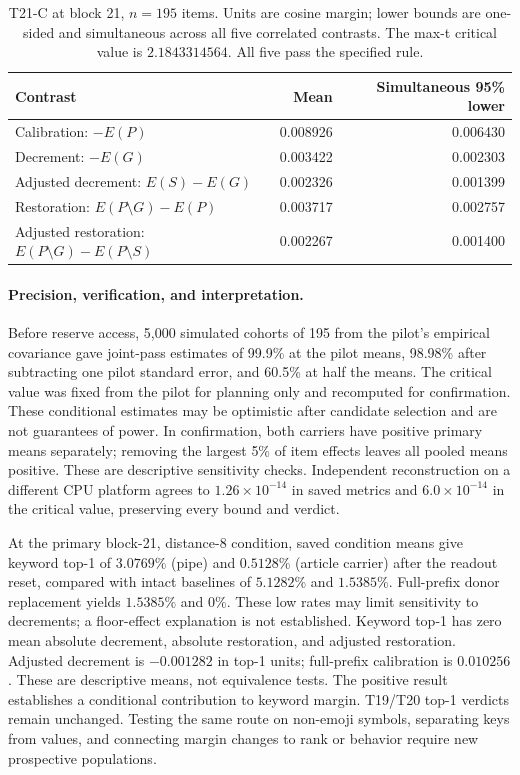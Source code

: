 \documentclass{article}
\begin{document}
\begin{table}[ht]
\centering
\small
\begin{tabular}{lrr}
\toprule
Contrast & Mean & Simultaneous 95\% lower \\
\midrule
Calibration: $-E(P)$ & 0.008926 & 0.006430 \\
Decrement: $-E(G)$ & 0.003422 & 0.002303 \\
Adjusted decrement: $E(S)-E(G)$ & 0.002326 & 0.001399 \\
Restoration: $E(P\setminus G)-E(P)$ & 0.003717 & 0.002757 \\
Adjusted restoration: $E(P\setminus G)-E(P\setminus S)$ & 0.002267 & 0.001400 \\
\bottomrule
\end{tabular}
\caption{T21-C at block 21, $n=195$ items. Units are cosine margin; lower
bounds are one-sided and simultaneous across all five correlated contrasts.
The max-t critical value is $2.1843314564$. All five pass the specified rule.}
\label{tab:t21}
\end{table}

\paragraph{Precision, verification, and interpretation.}
Before reserve access, 5,000 simulated cohorts of 195 from the pilot's
empirical covariance gave joint-pass estimates of 99.9\% at the pilot means,
98.98\% after subtracting one pilot standard error, and 60.5\% at half the
means. The critical value was fixed from the pilot for planning only and
recomputed for confirmation. These conditional estimates may be optimistic
after candidate selection and are not guarantees of power.
In confirmation, both carriers have positive primary means separately;
removing the largest 5\% of item effects leaves all pooled means positive.
These are descriptive sensitivity checks. Independent reconstruction on a
different CPU platform agrees to $1.26\times10^{-14}$ in saved metrics and
$6.0\times10^{-14}$ in the critical value, preserving every bound and verdict.

At the primary block-21, distance-8 condition, saved condition means give
keyword top-1 of $3.0769\%$ (pipe) and $0.5128\%$ (article carrier) after
the readout reset, compared with intact baselines of $5.1282\%$ and
$1.5385\%$. Full-prefix donor replacement yields $1.5385\%$ and $0\%$.
These low rates may limit sensitivity to decrements; a floor-effect
explanation is not established.
Keyword top-1 has zero mean absolute decrement, absolute restoration, and
adjusted restoration. Adjusted decrement is $-0.001282$ in top-1 units;
full-prefix calibration is $0.010256$. These are descriptive means, not
equivalence tests. The positive result establishes a conditional contribution
to keyword margin. T19/T20 top-1 verdicts remain unchanged. Testing the
same route on non-emoji symbols, separating keys from values, and connecting
margin changes to rank or behavior require new prospective populations.
\end{document}
